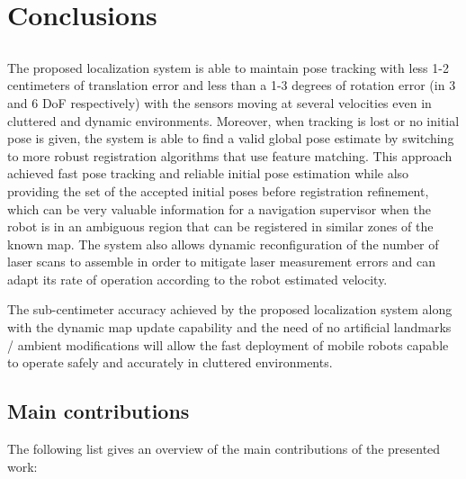 \chapter{Conclusions} \label{chap:conclusions-and-future-work}



\section*{}

The proposed localization system is able to maintain pose tracking with less 1-2 centimeters of translation error and less than a 1-3 degrees of rotation error (in 3 and 6 DoF respectively) with the sensors moving at several velocities even in cluttered and dynamic environments. Moreover, when tracking is lost or no initial pose is given, the system is able to find a valid global pose estimate by switching to more robust registration algorithms that use feature matching. This approach achieved fast pose tracking and reliable initial pose estimation while also providing the set of the accepted initial poses before registration refinement, which can be very valuable information for a navigation supervisor when the robot is in an ambiguous region that can be registered in similar zones of the known map. The system also allows dynamic reconfiguration of the number of laser scans to assemble in order to mitigate laser measurement errors and can adapt its rate of operation according to the robot estimated velocity.

The sub-centimeter accuracy achieved by the proposed localization system along with the dynamic map update capability and the need of no artificial landmarks / ambient modifications will allow the fast deployment of mobile robots capable to operate safely and accurately in cluttered environments.



\section{Main contributions}

The following list gives an overview of the main contributions of the presented work:

